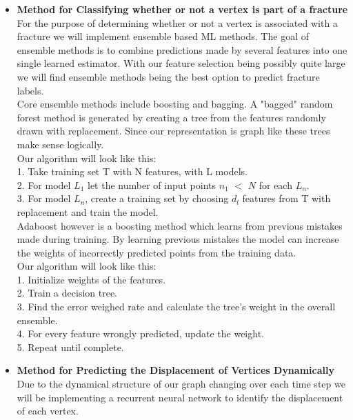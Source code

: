 \begin{itemize}
\begin{itemize}
\bigskip
\item \textbf{Method for Classifying whether or not a vertex is part of a fracture}
\bigskip
\\
For the purpose of determining whether or not a vertex is associated with a fracture we will implement ensemble based ML methods. The goal of ensemble methods is to combine predictions made by several features into one single learned estimator. With our feature selection being possibly quite large we will find ensemble methods being the best option to predict fracture labels. 
\bigskip
\\
Core ensemble methods include boosting and bagging. A "bagged" random forest method is generated by creating a tree from the features randomly drawn with replacement. Since our representation is graph like these trees make sense logically. 
\bigskip
\\
Our algorithm will look like this:
\\
1. Take training set T with N features, with L models.
\\
2. For model $L _{1}$ let the number of input points $n_{1}$ $<$ $N$ for each $L_{n}$.
\\
3. For model $L_{n}$, create a training set by choosing $d_{l}$ features from T with replacement and train the model.
\bigskip
\\
Adaboost however is a boosting method which learns from previous mistakes made during training. By learning previous mistakes the model can increase the weights of incorrectly predicted points from the training data. 
\bigskip
\\
Our algorithm will look like this:
\\
1. Initialize weights of the features. 
\\
2. Train a decision tree.
\\
3. Find the error weighed rate and calculate the tree's weight in the overall ensemble. 
\\
4. For every feature wrongly predicted, update the weight. 
\\
5. Repeat until complete. 
\item \textbf{Method for Predicting the Displacement of Vertices Dynamically}
\bigskip
\\
Due to the dynamical structure of our graph changing over each time step we will be implementing a recurrent neural network to identify the displacement of each vertex. 


\end{itemize}
\end{itemize}
